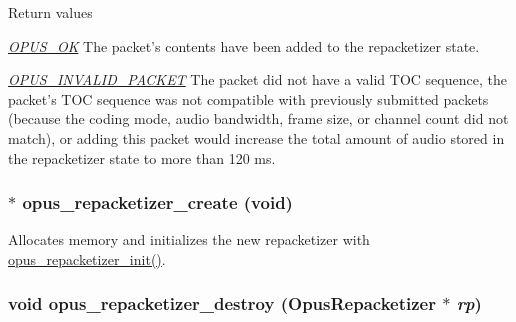 \begin{DoxyRetVals}{Return values}
\item[{\em \hyperlink{group__opus__errorcodes_gaa44cf8a185e1b5cb940ef63eb4f02d21}{OPUS\_\-OK}}]The packet's contents have been added to the repacketizer state. \item[{\em \hyperlink{group__opus__errorcodes_ga46fc9dd493fb8e291bd8e838f0988bb7}{OPUS\_\-INVALID\_\-PACKET}}]The packet did not have a valid TOC sequence, the packet's TOC sequence was not compatible with previously submitted packets (because the coding mode, audio bandwidth, frame size, or channel count did not match), or adding this packet would increase the total amount of audio stored in the repacketizer state to more than 120 ms. \end{DoxyRetVals}
\hypertarget{group__opus__repacketizer_ga6f8813666ef851550ecf8658a731ff7d}{
\subsubsection[{opus\_\-repacketizer\_\-create}]{$\ast$ opus\_\-repacketizer\_\-create (void)}}
\label{group__opus__repacketizer_ga6f8813666ef851550ecf8658a731ff7d}


Allocates memory and initializes the new repacketizer with \hyperlink{group__opus__repacketizer_gab42ff7c3f8a49ff5029fcf60f3b853f0}{opus\_\-repacketizer\_\-init()}. \hypertarget{group__opus__repacketizer_gadb08b25d2a29a559c35774cfe2a1b886}{
\subsubsection[{opus\_\-repacketizer\_\-destroy}]{\setlength{\rightskip}{0pt plus 5cm}void opus\_\-repacketizer\_\-destroy ({\bf OpusRepacketizer} $\ast$ {\em rp})}}
\label{group__opus__repacketizer_gadb08b25d2a29a559c35774cfe2a1b886}


